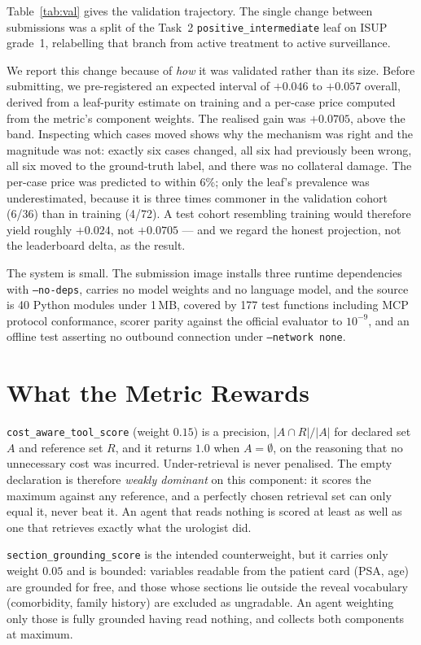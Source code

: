 \documentclass[runningheads]{llncs}
\newcommand{\code}[1]{\texttt{\small #1}}
\begin{document}
Table~\ref{tab:val} gives the validation trajectory. The single change between
submissions was a split of the Task~2 \code{positive\_intermediate} leaf on
ISUP grade~1, relabelling that branch from active treatment to active surveillance.

We report this change because of \emph{how} it was validated rather than its size.
Before submitting, we pre-registered an expected interval of $+0.046$ to $+0.057$
overall, derived from a leaf-purity estimate on training and a per-case price
computed from the metric's component weights. The realised gain was $+0.0705$,
above the band. Inspecting which cases moved shows why the mechanism was right and
the magnitude was not: exactly six cases changed, all six had previously been
wrong, all six moved to the ground-truth label, and there was no collateral damage.
The per-case price was predicted to within 6\%; only the leaf's prevalence was
underestimated, because it is three times commoner in the validation cohort (6/36)
than in training (4/72). A test cohort resembling training would therefore yield
roughly $+0.024$, not $+0.0705$ --- and we regard the honest projection, not the
leaderboard delta, as the result.

The system is small. The submission image installs three runtime dependencies with
\code{--no-deps}, carries no model weights and no language model, and the source is
40 Python modules under 1\,MB, covered by 177 test functions including MCP protocol
conformance, scorer parity against the official evaluator to $10^{-9}$, and an
offline test asserting no outbound connection under \code{--network none}.

\section{What the Metric Rewards}
\label{sec:metric}

\code{cost\_aware\_tool\_score} (weight $0.15$) is a precision,
$|A \cap R| / |A|$ for declared set $A$ and reference set $R$, and it returns
$1.0$ when $A = \emptyset$, on the reasoning that no unnecessary cost was incurred.
Under-retrieval is never penalised. The empty declaration is therefore
\emph{weakly dominant} on this component: it scores the maximum against any
reference, and a perfectly chosen retrieval set can only equal it, never beat it.
An agent that reads nothing is scored at least as well as one that retrieves
exactly what the urologist did.

\code{section\_grounding\_score} is the intended counterweight, but it carries only
weight $0.05$ and is bounded: variables readable from the patient card (PSA, age)
are grounded for free, and those whose sections lie outside the reveal vocabulary
(comorbidity, family history) are excluded as ungradable. An agent weighting only
those is fully grounded having read nothing, and collects both components at
maximum.
\end{document}
